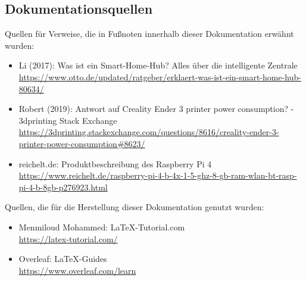 \subsection{Dokumentationsquellen}
Quellen für Verweise, die in Fußnoten innerhalb dieser Dokumentation erwähnt wurden:
\begin{itemize}
 		\item Li (2017): Was ist ein Smart-Home-Hub? Alles über die intelligente Zentrale\\ {\url{https://www.otto.de/updated/ratgeber/erklaert-was-ist-ein-smart-home-hub-80634/}}
 		\item Robert (2019): Antwort auf Creality Ender 3 printer power consumption? - 3dprinting Stack Exchange\\ {\url{https://3dprinting.stackexchange.com/questions/8616/creality-ender-3-printer-power-consumption#8623/}}
 		\item reichelt.de: Produktbeschreibung des Raspberry Pi 4\\{\url{https://www.reichelt.de/raspberry-pi-4-b-4x-1-5-ghz-8-gb-ram-wlan-bt-rasp-pi-4-b-8gb-p276923.html}}
 		
\end{itemize}
Quellen, die für die Herstellung dieser Dokumentation genutzt wurden:
\begin{itemize}
	\item Menmiloud Mohammed: \LaTeX -Tutorial.com\\{\url{https://latex-tutorial.com/}}
	\item Overleaf: \LaTeX -Guides\\{\url{https://www.overleaf.com/learn}}
\end{itemize}